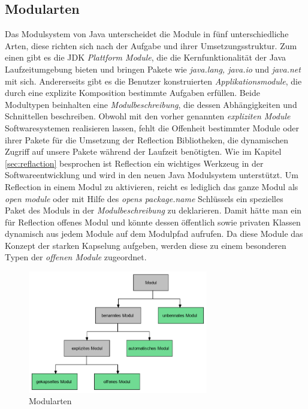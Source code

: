   \subsection{Modularten}
    Das Modulsystem von Java unterscheidet die Module in fünf unterschiedliche Arten, diese richten sich nach der Aufgabe und ihrer Umsetzungsstruktur. 
    Zum einen gibt es die JDK \textit{Plattform Module}, die die Kernfunktionalität der Java Laufzeitumgebung bieten und bringen Pakete wie \textit{java.lang, java.io} und \textit{java.net} mit sich. 
    Andererseits gibt es die Benutzer konstruierten \textit{Applikationsmodule}, die durch eine explizite Komposition bestimmte Aufgaben erfüllen.  
    Beide Modultypen beinhalten eine \textit{Modulbeschreibung}, die dessen Abhängigkeiten und Schnittellen beschreiben. 
    \newline Obwohl mit den vorher genannten \textit{expliziten Module} Softwaresystemen realisieren lassen, fehlt die Offenheit bestimmter Module oder ihrer Pakete für die Umsetzung der Reflection Bibliotheken, die dynamischen Zugriff auf unsere Pakete während der Laufzeit benötigten. 
    Wie im Kapitel \ref{sec:reflaction} besprochen ist Reflection ein wichtiges Werkzeug in der Softwareentwicklung und wird in den neuen Java Modulsystem unterstützt. 
    Um Reflection in einem Modul zu aktivieren, reicht es lediglich das ganze Modul als \textit{open module} oder mit Hilfe des \textit{opens package.name} Schlüssels ein spezielles Paket des Moduls in der \textit{Modulbeschreibung} zu deklarieren.  
    Damit hätte man ein für Reflection offenes Modul und könnte dessen öffentlich sowie privaten Klassen dynamisch aus jedem Module auf dem Modulpfad aufrufen.
    Da diese Module das Konzept der starken Kapselung aufgeben, werden diese zu einem besonderen Typen der \textit{offenen Module} zugeordnet.
    \begin{figure}[h]
      \centering
      \includegraphics[width=0.7\textwidth]{material/images/module-tree.png}
      \caption{Modularten}
      \label{fig:kopplung}
    \end{figure}
